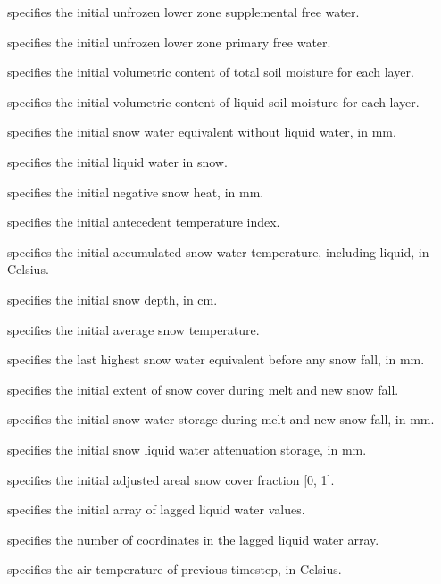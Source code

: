  specifies the initial
 unfrozen lower zone supplemental free water.

  specifies the initial
 unfrozen lower zone primary free water.

  specifies the initial volumetric
 content of total soil moisture for each layer.

  specifies the initial volumetric
 content of liquid soil moisture for each layer.

  specifies the initial snow water
 equivalent without liquid water, in mm.

  specifies the initial liquid water
 in snow.

  specifies the initial negative
 snow heat, in mm.

  specifies the initial antecedent
 temperature index.

  specifies the initial accumulated
 snow water temperature, including liquid, in Celsius.

  specifies the initial snow depth,
 in cm.

  specifies the initial average
 snow temperature.

  specifies the last highest snow
 water equivalent before any snow fall, in mm.

  specifies the initial extent
 of snow cover during melt and new snow fall.

  specifies the initial snow water
 storage during melt and new snow fall, in mm.

  specifies the initial snow
 liquid water attenuation storage, in mm.

  specifies the initial adjusted
 areal snow cover fraction [0, 1].

  specifies the initial array of
 lagged liquid water values.

  specifies the number of
 coordinates in the lagged liquid water array.

  specifies the air temperature
 of previous timestep, in Celsius.
 

